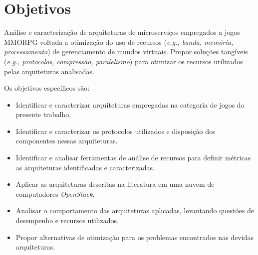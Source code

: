 \section{Objetivos}
\label{obj}

Análise e caracterização de arquiteturas de microserviços empregados a jogos MMORPG voltada a otimização do uso de recursos (\textit{e.g., banda, memória, processamento}\cite{1417630}) de gerenciamento de mundos virtuais. Propor soluções tangíveis (\textit{e.g., protocolos, compressão, paralelismo}\cite{1417630}) para otimizar os recursos utilizados pelas arquiteturas analisadas.

Os objetivos específicos são:
\begin{itemize}
    \item Identificar e caracterizar arquiteturas empregadas na categoria de jogos do presente trabalho.
    \item Identificar e caracterizar os protocolos utilizados e disposição dos componentes nessas arquiteturas.
    \item Identificar e analisar ferramentas de análise de recursos para definir métricas as arquiteturas identificadas e caracterizadas.
    \item Aplicar as arquiteturas descritas na literatura em uma nuvem de computadores \textit{OpenStack}.
    \item Analisar o comportamento das arquiteturas aplicadas, levantando questões de desempenho e recursos utilizados.
    \item Propor alternativas de otimização para os problemas encontrados nas devidas arquiteturas.
\end{itemize}
